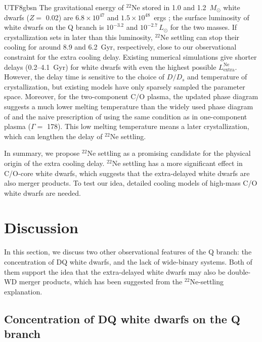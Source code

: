 \documentclass[twocolumn, times, trackchanges]{aastex63_bren}
\begin{document}
\begin{CJK*}{UTF8}{gbsn}
The gravitational energy of $^{22}$Ne stored in 1.0 and 1.2~$M_\odot$ white dwarfs ($Z=$ 0.02) are $6.8\times10^{47}$ and $1.5\times10^{48}$~ergs \citep{Bildsten_2001}; the surface luminosity of white dwarfs on the Q branch is $10^{-3.2}$ and $10^{-2.7}\,L_\odot$ for the two masses. If crystallization sets in later than this luminosity, $^{22}$Ne settling can stop their cooling for around 8.9 and 6.2~Gyr, respectively, close to our observational constraint for the extra cooling delay. Existing numerical simulations \citep{Deloye_2002, Garcia-Berro_2008, Althaus_2010, Camisassa_2016} give shorter delays (0.2--4.1~Gyr) for white dwarfs with even the highest possible $L^\text{Ne}_\text{extra}$. However, the delay time is sensitive to the choice of $D/D_s$ and temperature of crystallization, but existing models have only sparsely sampled the parameter space. Moreover, for the two-component C/O plasma, the updated phase diagram \citep{Horowitz_2010, Hughto_2012} suggests a much lower melting temperature than the widely used phase diagram of \citet[][]{Segretain_1993} and the naive prescription of using the same condition as in one-component plasma ($\Gamma=$ 178). This low melting temperature means a later crystallization, which can lengthen the delay of $^{22}$Ne settling.

In summary, we propose $^{22}$Ne settling as a promising candidate for the physical origin of the extra cooling delay. $^{22}$Ne settling has a more significant effect in C/O-core white dwarfs, which suggests that the extra-delayed white dwarfs are also merger products. To test our idea, detailed cooling models of high-mass C/O white dwarfs are needed.


\section{Discussion}
\label{sec:discussion}

In this section, we discuss two other observational features of the Q branch: the concentration of DQ white dwarfs, and the lack of wide-binary systems. Both of them support the idea that the extra-delayed white dwarfs may also be double-WD merger products, which has been suggested from the $^{22}$Ne-settling explanation.


\subsection{Concentration of DQ white dwarfs on the Q branch}
\label{sec:DQ}


\end{CJK*}
\end{document}
